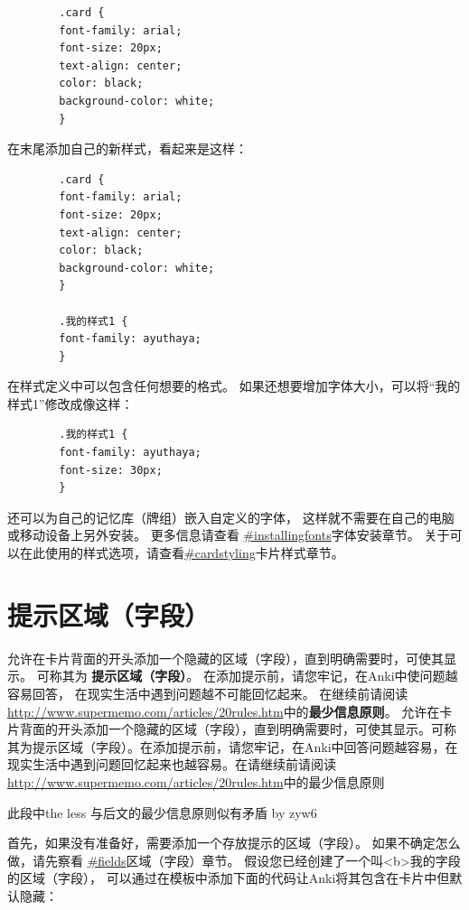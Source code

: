 \documentclass[a4paper]{book}
\begin{document}
	\begin{shaded}\begin{verbatim}
		.card {
		font-family: arial;
		font-size: 20px;
		text-align: center;
		color: black;
		background-color: white;
		}
		\end{verbatim}\end{shaded}
	在末尾添加自己的新样式，看起来是这样：
	\begin{shaded}\begin{verbatim}
		.card {
		font-family: arial;
		font-size: 20px;
		text-align: center;
		color: black;
		background-color: white;
		}
		
		.我的样式1 {
		font-family: ayuthaya;
		}
		\end{verbatim}\end{shaded}
	在样式定义中可以包含任何想要的格式。 如果还想要增加字体大小，可以将“我的样式1”修改成像这样：
	
	\begin{shaded}\begin{verbatim}
		.我的样式1 {
		font-family: ayuthaya;
		font-size: 30px;
		}
		\end{verbatim}\end{shaded}
	还可以为自己的记忆库（牌组）嵌入自定义的字体， 这样就不需要在自己的电脑或移动设备上另外安装。 更多信息请查看
	\url{#installingfonts}字体安装章节。
	关于可以在此使用的样式选项，请查看\url{#cardstyling}卡片样式章节。
	
	\section{提示区域（字段）}
	允许在卡片背面的开头添加一个隐藏的区域（字段），直到明确需要时，可使其显示。 可称其为
	\textbf{提示区域（字段）}。 在添加提示前，请您牢记，在Anki中使问题越容易回答， 在现实生活中遇到问题越不可能回忆起来。 在继续前请阅读
	\url{http://www.supermemo.com/articles/20rules.htm}中的\textbf{最少信息原则}。
	允许在卡片背面的开头添加一个隐藏的区域（字段），直到明确需要时，可使其显示。可称其为提示区域（字段）。在添加提示前，请您牢记，在Anki中回答问题越容易，在现实生活中遇到问题回忆起来也越容易。在请继续前请阅读\url{http://www.supermemo.com/articles/20rules.htm}中的最少信息原则
	
	此段中the less 与后文的最少信息原则似有矛盾 by zyw6
	
	首先，如果没有准备好，需要添加一个存放提示的区域（字段）。 如果不确定怎么做，请先察看
	\url{#fields}区域（字段）章节。
	假设您已经创建了一个叫<b>我的字段的区域（字段）， 可以通过在模板中添加下面的代码让Anki将其包含在卡片中但默认隐藏：
	
\end{document}
